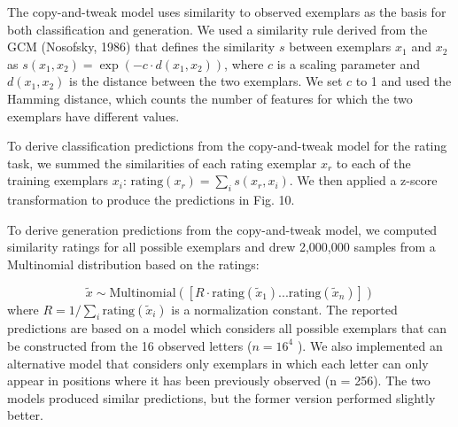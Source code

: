 \documentclass[12pt]{article}
\begin{document}
\begin{displayquote}

The copy-and-tweak model uses similarity to observed exemplars as the basis for both classification and generation. We used a similarity rule derived from the GCM (Nosofsky, 1986) that defines the similarity $s$ between exemplars $x_1$ and $x_2$ as $s(x_1,x_2) = \exp (-c \cdot d(x_1,x_2))$, where $c$ is a scaling parameter and $d(x_1,x_2)$ is the distance between the two exemplars. We set $c$ to 1 and used the Hamming distance, which counts the number of features for which the two exemplars have different values.

To derive classification predictions from the copy-and-tweak model for the rating task, we summed the similarities of each rating exemplar $x_r$ to each of the training exemplars $x_i$: $\text{rating}(x_r) =\sum_i{s(x_r,x_i)}$. We then applied a z-score transformation to produce the predictions in Fig. 10. 

To derive generation predictions from the copy-and-tweak model, we computed similarity ratings for all possible exemplars and drew 2,000,000 samples from a Multinomial distribution based on the ratings:

\begin{equation}
  \widetilde{x} \sim \text{Multinomial}([R \cdot \text{rating}(\widetilde{x}_1) ... \text{rating}(\widetilde{x}_n)])
\end{equation}
% 
where $R = 1/\sum_i{\text{rating}(\widetilde{x}_i)}$ is a normalization constant. The reported predictions are based on a model which considers all possible exemplars that can be constructed from the 16 observed letters ($n = 16^4$ ). We also implemented an alternative model that considers only exemplars in which each letter can only appear in positions where it has been previously observed (n = 256). The two models produced similar predictions, but the former version performed slightly better.
\end{displayquote}
\end{document}
